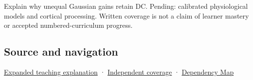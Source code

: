 Explain why unequal Gaussian gains retain DC. Pending: calibrated physiological models and cortical processing. Written coverage is not a claim of learner mastery or accepted numbered-curriculum progress.

\subsection{Source and navigation}\label{appendix-7281c15ac44a-source-and-navigation}

\hyperref[04-visual-computing-ii-ch042-the-eye-is-an-optical-instrument-with-neural-processing-inside-it]{Expanded teaching explanation} · \hyperref[appendix-fd090d982a15-xr01---independent-seeing-and-representation-source]{Independent coverage} · \hyperref[appendix-4ad47bdd269a]{Dependency Map}
